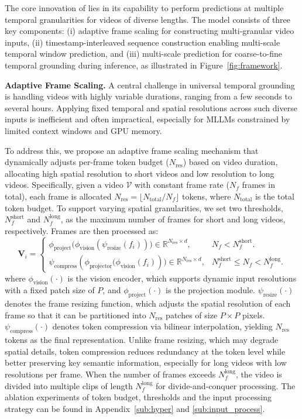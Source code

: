 The core innovation of \Model{} lies in its capability 
to perform predictions at multiple temporal granularities for videos of diverse lengths.
The model consists of three key components:
(i) adaptive frame scaling for constructing multi-granular
video inputs, 
(ii) timestamp-interleaved sequence construction enabling multi-scale temporal window prediction, and (iii) multi-scale prediction for coarse-to-fine temporal grounding during inference, as illustrated in Figure~\ref{fig:framework}.

\noindent \textbf{Adaptive Frame Scaling.} 
A central challenge in universal temporal grounding is handling videos with highly variable durations, ranging from a few seconds to several hours. Applying fixed temporal and spatial resolutions across such diverse inputs is inefficient and often impractical, especially for MLLMs constrained by limited context windows and GPU memory.

To address this, we propose an adaptive frame scaling mechanism that dynamically adjusts per-frame token budget ($N_{\text{res}}$) based on video duration, allocating high spatial resolution to short videos and low resolution to long videos.
Specifically, given a video $\mathcal{V}$ with constant frame rate ($N_f$ frames in total), each frame is allocated $N_{\text{res}} = \lfloor N_{\text{total}} / N_f \rfloor$ tokens, where $N_{\text{total}}$ is the total token budget.
To support varying spatial granularities, we set two thresholds, $N_f^{\text{short}}$ and $N_f^{\text{long}}$, as the maximum number of frames for short and long videos, respectively. Frames are then processed as:
\begin{equation*}
  \mathbf{V}_i = \begin{cases}
    \phi_{\text{project}}\big(\phi_{\text{vision}}(
\psi_\text{resize}(f_i))\big) \in \mathbb{R}^{N_{\text{res}} \times d}, & N_f < N_f^{\text{short}}.\\
    \psi_\text{compress}(\phi_{\text{projector}}\big(\phi_{\text{vision}}(f_i))\big) \in \mathbb{R}^{N_{\text{res}} \times d}, & N_f^{\text{short}} \leq N_f < N_f^{\text{long}}.
  \end{cases}
\end{equation*}
where $\phi_{\text{vision}}(\cdot)$ is the vision encoder, which supports dynamic input resolutions with a fixed patch size of $P$, and $\phi_{\text{project}}(\cdot)$ is the projection module.
$\psi_{\text{resize}}(\cdot)$ denotes the frame resizing function, which adjusts the spatial resolution of each frame so that it can be partitioned into $N_{\text{res}}$ patches of size $P \times P$ pixels.
$\psi_{\text{compress}}(\cdot)$ denotes token compression via bilinear interpolation, yielding $N_{\text{res}}$ tokens as the final representation. 
Unlike frame resizing, which may degrade spatial details, token compression reduces redundancy at the token level while better preserving key semantic information, especially for long videos with low resolutions per frame.
When the number of frames exceeds $N_f^{\text{long}}$, the video is divided into multiple clips of length $N_f^{\text{long}}$ for divide-and-conquer processing. 
The ablation experiments of token budget, thresholds and the input processing strategy can be found in Appendix~\ref{sub:hyper} and \ref{sub:input_process}.


